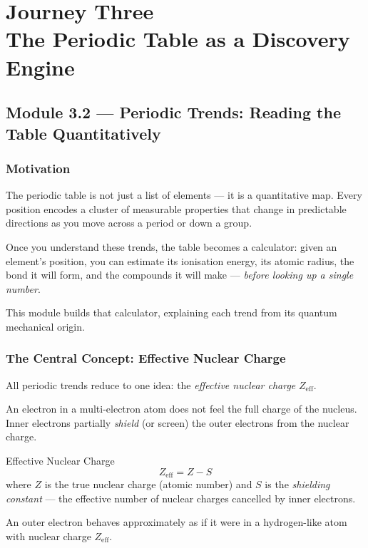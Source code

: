 \documentclass[12pt, a4paper]{book}
\newcommand{\newterm}[1]{\textit{\textcolor{DiscoveryColor}{#1}}}
\begin{document}
\setcounter{chapter}{2}
\chapter[Journey 3 --- The Periodic Table as a Discovery Engine]
        {Journey Three\\[8pt]
         \textcolor{ModuleColor}{\large The Periodic Table as a Discovery Engine}}
\setcounter{section}{1}

\section{Module 3.2 --- Periodic Trends: Reading the Table Quantitatively}
\label{sec:mod3.2}

\subsection*{Motivation}

The periodic table is not just a list of elements ---
it is a quantitative map.
Every position encodes a cluster of measurable properties
that change in predictable directions as you move
across a period or down a group.

Once you understand these trends, the table becomes
a calculator: given an element's position,
you can estimate its ionisation energy,
its atomic radius, the bond it will form,
and the compounds it will make ---
\emph{before looking up a single number}.

This module builds that calculator,
explaining each trend from its quantum mechanical origin.

\subsection{The Central Concept: Effective Nuclear Charge}

All periodic trends reduce to one idea:
the \newterm{effective nuclear charge} $Z_\text{eff}$.

An electron in a multi-electron atom does not feel
the full charge of the nucleus.
Inner electrons partially \newterm{shield} (or screen)
the outer electrons from the nuclear charge.

\begin{namedconcept}{Effective Nuclear Charge}
\[
  Z_\text{eff} = Z - S
\]
where $Z$ is the true nuclear charge (atomic number)
and $S$ is the \newterm{shielding constant} ---
the effective number of nuclear charges cancelled
by inner electrons.

An outer electron behaves approximately as if it were
in a hydrogen-like atom with nuclear charge $Z_\text{eff}$.
\end{namedconcept}
\end{document}
